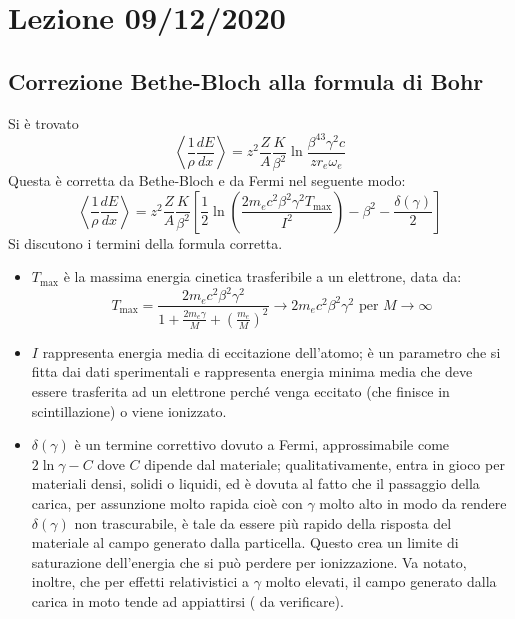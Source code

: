 \documentclass[10pt, a4paper]{scrartcl}
\numberwithin{equation}{subsection}
\theoremstyle{style1}
\begin{document}
\newpage

\section{Lezione 09/12/2020}

\subsection{Correzione Bethe-Bloch alla formula di Bohr}

Si \`e trovato 
\begin{equation}
	\left\langle \frac{1}{\rho }\frac{d E}{d x}  \right\rangle = z^2 \frac{Z}{A} \frac{K}{\beta ^2}\ln \frac{\beta ^43 \gamma^2  c}{zr_e \omega_e}
\end{equation}
Questa \`e corretta da Bethe-Bloch e da Fermi nel seguente modo:
\begin{equation}
	\left\langle \frac{1}{\rho } \frac{d E}{d x}  \right\rangle = z^2 \frac{Z}{A} \frac{K}{\beta ^2} \left[ \frac{1}{2} \ln \left(\frac{2 m_e c^2 \beta ^2 \gamma^2 T_\text{max}}{I^2}\right)  - \beta ^2 - \frac{\delta (\gamma)}{2} \right] 
\end{equation}
Si discutono i termini della formula corretta.
\begin{itemize}
	\item $T_\text{max}$ \`e la massima energia cinetica trasferibile a un elettrone, data da:
		\begin{equation}
			T_\text{max} = \frac{2m_e c^2 \beta ^2 \gamma^2}{1 + \frac{2 m_e \gamma}{M} + \left(\frac{m_e}{M}\right) ^2} \to 2 m_e c^2 \beta ^2 \gamma^2 \text{ per } M \to \infty
		\end{equation}
	\item $I$ rappresenta energia media di eccitazione dell'atomo; \`e un parametro che si fitta dai dati sperimentali e rappresenta energia minima media che deve essere trasferita ad un elettrone perch\'e venga eccitato (che finisce in scintillazione) o viene ionizzato.
\item $\delta (\gamma)$ \`e un termine correttivo dovuto a Fermi, approssimabile come $2\ln \gamma - C$ dove $C $ dipende dal materiale; qualitativamente, entra in gioco per materiali densi, solidi o liquidi, ed \`e dovuta al fatto che il passaggio della carica, per assunzione molto rapida cio\`e con $\gamma $ molto alto in modo da rendere $\delta (\gamma)$ non trascurabile, \`e tale da essere pi\`u rapido della risposta del materiale al campo generato dalla particella. Questo crea un limite di saturazione dell'energia che si pu\`o perdere per ionizzazione. Va notato, inoltre, che per effetti relativistici a $\gamma$ molto elevati, il campo generato dalla carica in moto tende ad appiattirsi ({\color{red} da verificare}).
\end{itemize}
\end{document}
